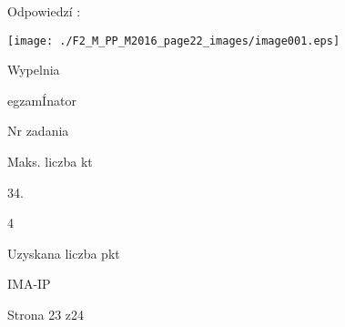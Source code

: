 \documentclass[a4paper,12pt]{article}
\begin{document}
Odpowiedzí :
\begin{center}
\texttt{[image: ./F2\_M\_PP\_M2016\_page22\_images/image001.eps]}
\end{center}
Wypelnia

egzamÍnator

Nr zadania

Maks. liczba kt

34.

4

Uzyskana liczba pkt

IMA-IP

Strona 23 z24
\end{document}
